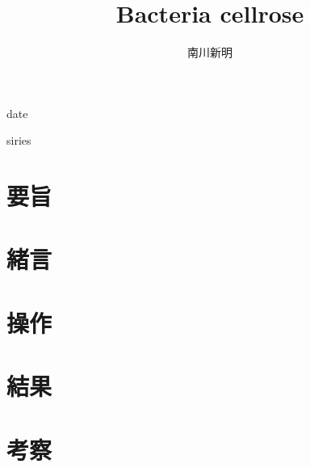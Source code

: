 \documentclass[uplatex, dvipdfmx, 10pt]{jarticle}
\title{{\huge Bacteria cellrose}}
\author{南川新明}
\begin{document}
            \begin{titlepage}
                \begin{center}
                    \Large{date}

                    \Large{siries}

                    \Huge{}
                                                                                            
                \end{center}
            \end{titlepage}
        \section*{要旨}

        \section*{緒言}
            
        \section*{操作}
        
        \section*{結果}

        \section*{考察}

        
    
\end{document}
